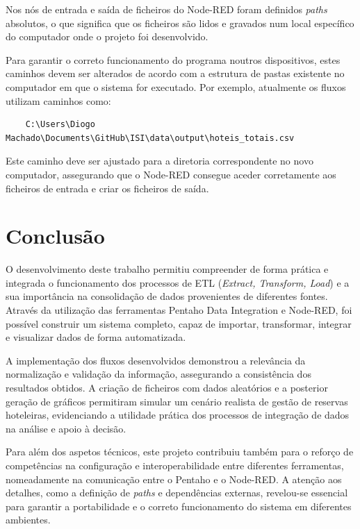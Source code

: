 \documentclass[a4paper, 12pt]{article} %
\begin{document}
Nos nós de entrada e saída de ficheiros do Node-RED foram definidos \textit{paths} absolutos, o que significa que os ficheiros são lidos e gravados num local específico do computador onde o projeto foi desenvolvido.  

Para garantir o correto funcionamento do programa noutros dispositivos, estes caminhos devem ser alterados de acordo com a estrutura de pastas existente no computador em que o sistema for executado. Por exemplo, atualmente os fluxos utilizam caminhos como:  

\begin{verbatim}
	C:\Users\Diogo Machado\Documents\GitHub\ISI\data\output\hoteis_totais.csv
\end{verbatim}

Este caminho deve ser ajustado para a diretoria correspondente no novo computador, assegurando que o Node-RED consegue aceder corretamente aos ficheiros de entrada e criar os ficheiros de saída.

\section{Conclusão}

O desenvolvimento deste trabalho permitiu compreender de forma prática e integrada o funcionamento dos processos de ETL (\textit{Extract, Transform, Load}) e a sua importância na consolidação de dados provenientes de diferentes fontes. Através da utilização das ferramentas Pentaho Data Integration e Node-RED, foi possível construir um sistema completo, capaz de importar, transformar, integrar e visualizar dados de forma automatizada.

A implementação dos fluxos desenvolvidos demonstrou a relevância da normalização e validação da informação, assegurando a consistência dos resultados obtidos. A criação de ficheiros com dados aleatórios e a posterior geração de gráficos permitiram simular um cenário realista de gestão de reservas hoteleiras, evidenciando a utilidade prática dos processos de integração de dados na análise e apoio à decisão.

Para além dos aspetos técnicos, este projeto contribuiu também para o reforço de competências na configuração e interoperabilidade entre diferentes ferramentas, nomeadamente na comunicação entre o Pentaho e o Node-RED. A atenção aos detalhes, como a definição de \textit{paths} e dependências externas, revelou-se essencial para garantir a portabilidade e o correto funcionamento do sistema em diferentes ambientes.
\end{document}
